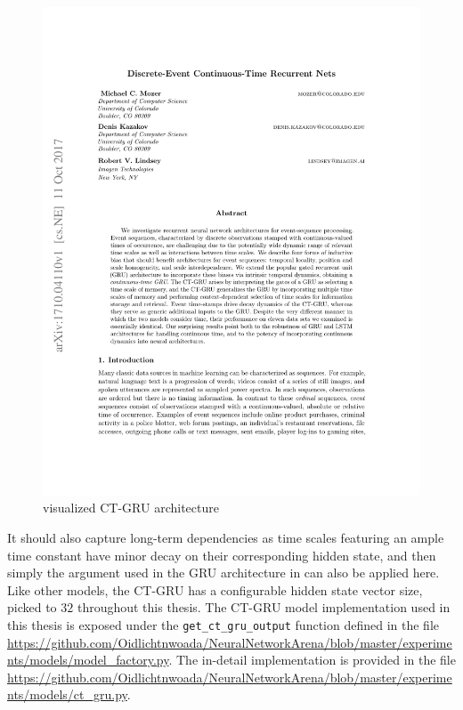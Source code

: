 \documentclass[draft,final]{vutinfth} %
\begin{document}
    \begin{figure}[H]
        \centering{}
        \includegraphics[page=4,width=0.8\linewidth,trim={300 605 150 85},clip]{literature/discrete_event_continuous_time_recurrent_nets.pdf}
        \caption{visualized CT-GRU architecture \cite[p. 4]{CTGRU}}
        \label{fig:ct_gru_vis}
    \end{figure}
    It should also capture long-term dependencies as time scales featuring an ample time constant have minor decay on their corresponding hidden state, and then simply the argument used in the GRU architecture in  can also be applied here.
    Like other models, the CT-GRU has a configurable hidden state vector size, picked to $32$ throughout this thesis.
    The CT-GRU model implementation used in this thesis is exposed under the \texttt{get\_ct\_gru\_output} function defined in the file \url{https://github.com/Oidlichtnwoada/NeuralNetworkArena/blob/master/experiments/models/model_factory.py}.
    The in-detail implementation is provided in the file \url{https://github.com/Oidlichtnwoada/NeuralNetworkArena/blob/master/experiments/models/ct_gru.py}.
\end{document}
